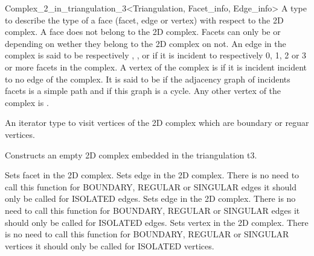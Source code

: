 \begin{ccRefClass}{Complex_2_in_triangulation_3<Triangulation, Facet_info, Edge_info>}
{A type to describe the type of a face (facet, edge or vertex) with respect to 
the 2D complex. A  face does not belong to the 2D complex.
Facets can only be    or 
depending on wether they belong to the 2D complex on not.
An edge in the complex is said to be respectively , 
,
 or 
 if it is incident to respectively 0, 1, 2  or 3 or
more facets in the complex. A vertex of the complex is
 if it is incident incident to no edge of the complex.
It is said to be   
if the adjacency graph of incidents facets 
is a simple path  and  if this graph is  a cycle.
Any other vertex of the complex is .}


\ccGlue
{}
\ccGlue
{}
\ccGlue
{}
\ccGlue
{}
\ccGlue
{}
\ccGlue
{}
\ccGlue
{}
{An iterator type to visit 
vertices of the 2D complex which are boundary  or reguar vertices.}



\ccCreation
{}  %

{Constructs an empty 2D complex embedded in the triangulation t3.}



\ccGlue
{}
{Sets facet  in the 2D complex.}
\ccGlue
{}
{Sets edge  in the 2D complex.
There is no need to call this function  for BOUNDARY,  
REGULAR or SINGULAR edges
it should only be called  for ISOLATED edges.}
\ccGlue
{}
{Sets edge in the 2D complex.
There is no need to call this function  for BOUNDARY,  
REGULAR or SINGULAR edges
it should only be called  for ISOLATED edges.}
\ccGlue
{}
{Sets vertex   in the 2D complex.
There is no need to call this function  for BOUNDARY,  
REGULAR or SINGULAR vertices
it should only be called  for ISOLATED vertices.}


\end{ccRefClass}
